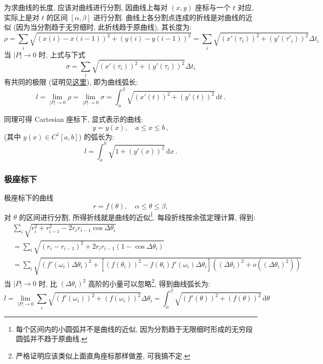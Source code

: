 \documentclass{book}
\newcommand{\dd}{\,\mathrm{d}}
\newcommand{\abs}[1]{\left\lvert #1 \right\rvert}
\renewcommand{\le}{\leqslant}
\numberwithin{equation}{section}
\numberwithin{figure}{section}
\theoremstyle{definition}
\begin{document}
为求曲线的长度, 应该对曲线进行分割, 因曲线上每对 $(x,y)$ 座标与一个 $t$ 对应, 实际上是对 $t$ 的区间 $[\alpha,\beta]$ 进行分割.
曲线上各分割点连成的折线是对曲线的近似 (因为当分割趋于无穷细时, 此折线趋于原曲线), 其长度为:
\begin{equation*}
  \rho=\sum_{i}^{}\sqrt{(x(i)-x(i-1))^2+(y(i)-y(i-1))^2}=\sum_{i}^{}\sqrt{(x'(\tau_i))^2+(y'(\tau'_i))^2}\Delta t_i
\end{equation*}
当 $\abs{P}\to0$ 时, 上式与下式
\begin{equation*}
  \sigma=\sum_{i}^{}\sqrt{(x'(\tau_i))^2+(y'(\tau_i))^2}\Delta t_i
\end{equation*}
有共同的极限 (证明见\hyperlink{proof:ArcLength}{这里}), 即为曲线弧长:
\begin{equation*}
  l=\lim_{\abs{P}\to0}\rho=\lim_{\abs{P}\to0}\sigma=\int_{\alpha}^{\beta} \sqrt{(x'(t))^2+(y'(t))^2} \dd t\,.
\end{equation*}

同理可得 Cartesian 座标下, 显式表示的曲线:
\begin{equation*}
  y=y(x),\quad a\le x\le b\,,
\end{equation*}
(其中 $y(x)\in C^1[a,b]$)
的弧长为:
\begin{equation*}
  l=\int_{a}^{b} \sqrt{1+(y'(x))^2} \dd x\,.
\end{equation*}
\subsubsection{极座标下}
极座标下的曲线
\begin{equation*}
  r=f(\theta),\quad \alpha\le\theta\le\beta,
\end{equation*}
对 $\theta$ 的区间进行分割, 所得折线就是曲线的近似\footnote{每个区间内的小圆弧并不是曲线的近似, 因为分割趋于无限细时形成的无穷段圆弧并不趋于原曲线.}. 每段折线按余弦定理计算, 得到:
\begin{align*}
  &\sum_{i}^{}\sqrt{r_i^2+r_{i-1}^2-2r_ir_{i-1}\cos\Delta\theta_i}\\
  &=\sum_{i}^{}\sqrt{(r_i-r_{i-1})^2+2r_ir_{i-1}(1-\cos\Delta\theta_i)}\\
  &=\sum_{i}^{}\sqrt{(f'(\omega_i)\Delta\theta_i)^2+[(f(\theta_i))^2-f(\theta_i)f'(\omega_i)\Delta\theta_i]((\Delta\theta_i)^2+o((\Delta\theta_i)^2))}
\end{align*}
当 $\abs{P}\to0$ 时, 比 $(\Delta\theta_i)^2$ 高阶的小量可以忽略\footnote{严格证明应该类似上面直角座标那样做差, 可我搞不定.}, 得到曲线弧长为:
\begin{equation*}
  l=\lim_{\abs{P}\to0}\sum_{i}^{}\sqrt{(f'(\omega_i))^2+(f(\omega_i))^2}\Delta\theta_i=\int_{\alpha}^{\beta} \sqrt{(f'(\theta))^2+(f(\theta))^2} \dd \theta
\end{equation*}
%
\end{document}

